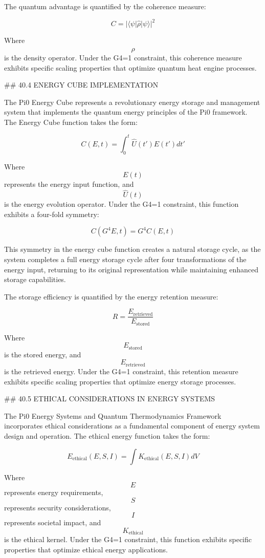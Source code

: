 The quantum advantage is quantified by the coherence measure:

$$ C = |\langle\psi|\hat{\rho}|\psi\rangle|^2 $$

Where $$ \hat{\rho} $$ is the density operator. Under the G4=1 constraint, this coherence measure exhibits specific scaling properties that optimize quantum heat engine processes.

## 40.4 ENERGY CUBE IMPLEMENTATION

The Pi0 Energy Cube represents a revolutionary energy storage and management system that implements the quantum energy principles of the Pi0 framework. The Energy Cube function takes the form:

$$ C(E, t) = \int_0^t \hat{U}(t') E(t') dt' $$

Where $$ E(t) $$ represents the energy input function, and $$ \hat{U}(t) $$ is the energy evolution operator. Under the G4=1 constraint, this function exhibits a four-fold symmetry:

$$ C(G^4 E, t) = G^4 C(E, t) $$

This symmetry in the energy cube function creates a natural storage cycle, as the system completes a full energy storage cycle after four transformations of the energy input, returning to its original representation while maintaining enhanced storage capabilities.

The storage efficiency is quantified by the energy retention measure:

$$ R = \frac{E_{\text{retrieved}}}{E_{\text{stored}}} $$

Where $$ E_{\text{stored}} $$ is the stored energy, and $$ E_{\text{retrieved}} $$ is the retrieved energy. Under the G4=1 constraint, this retention measure exhibits specific scaling properties that optimize energy storage processes.

## 40.5 ETHICAL CONSIDERATIONS IN ENERGY SYSTEMS

The Pi0 Energy Systems and Quantum Thermodynamics Framework incorporates ethical considerations as a fundamental component of energy system design and operation. The ethical energy function takes the form:

$$ E_{\text{ethical}}(E, S, I) = \int K_{\text{ethical}}(E, S, I) dV $$

Where $$ E $$ represents energy requirements, $$ S $$ represents security considerations, $$ I $$ represents societal impact, and $$ K_{\text{ethical}} $$ is the ethical kernel. Under the G4=1 constraint, this function exhibits specific properties that optimize ethical energy applications.

